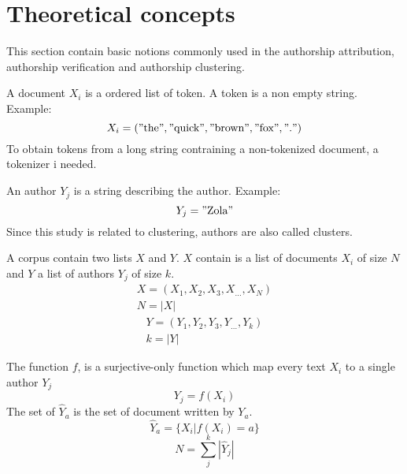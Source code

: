 \section{Theoretical concepts \label{sec:theoretical_concepts}}

This section contain basic notions commonly used in the authorship attribution, authorship verification and authorship clustering.

\begin{definition}[Document]
  A document $X_i$ is a ordered list of token. A token is a non empty string. Example:
  \begin{equation}
    X_i = ("\text{the}", "\text{quick}", "\text{brown}", "\text{fox}", "\text{.}")
  \end{equation}
  To obtain tokens from a long string contraining a non-tokenized document, a tokenizer i needed.
\end{definition}

\begin{definition}[Author]
  An author $Y_j$ is a string describing the author. Example:
  \begin{equation}
    Y_j = "\text{Zola}"
  \end{equation}
  Since this study is related to clustering, authors are also called clusters.
\end{definition}

\begin{definition}[Corpus]
  A corpus contain two lists $X$ and $Y$.
  $X$ contain is a list of documents $X_i$ of size $N$ and $Y$ a list of authors $Y_j$ of size $k$.
  \begin{gather}
    X = (X_1, X_2, X_3, X_{...}, X_N) \\
    N = |X|
  \end{gather}
  \begin{gather}
    Y = (Y_1, Y_2, Y_3, Y_{...}, Y_k) \\
    k = |Y|
  \end{gather}
\end{definition}

\begin{definition}
  The function $f$, is a surjective-only function which map every text $X_i$ to a single author $Y_j$
  \begin{equation}
    Y_j = f(X_i)
  \end{equation}
  The set of $\hat{Y}_a$ is the set of document written by $Y_a$.
  \begin{equation}
    \hat{Y}_a = \{X_i | f(X_i) = a\}
  \end{equation}
  \begin{equation}
    N = \sum_{j}^k |\hat{Y}_j|
  \end{equation}

\end{definition}

